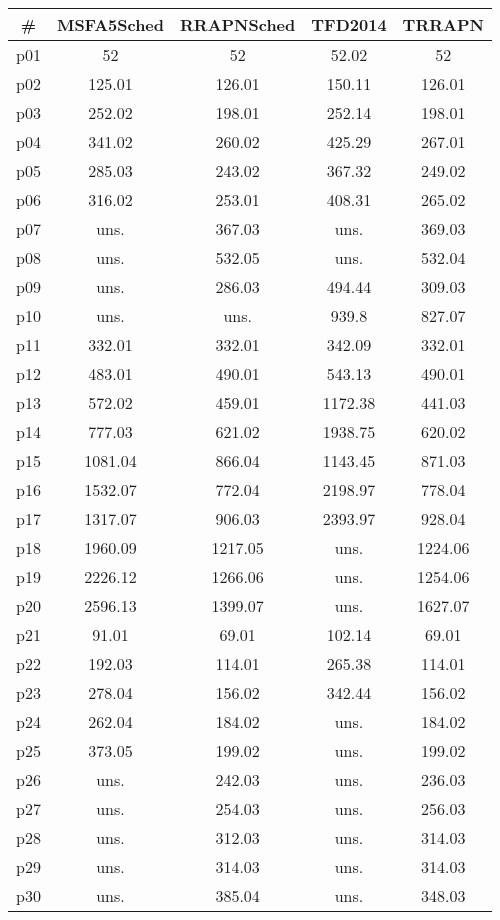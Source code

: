 \begin{tabular}{c||c|c|c|c}
\textbf{\#} & \textbf{MSFA5Sched} & \textbf{RRAPNSched} & \textbf{TFD2014} & \textbf{TRRAPN}\\
\hline
\hline
p01 & 52 & 52 & 52.02 & 52\\
p02 & 125.01 & 126.01 & 150.11 & 126.01\\
p03 & 252.02 & 198.01 & 252.14 & 198.01\\
p04 & 341.02 & 260.02 & 425.29 & 267.01\\
p05 & 285.03 & 243.02 & 367.32 & 249.02\\
p06 & 316.02 & 253.01 & 408.31 & 265.02\\
p07 & uns. & 367.03 & uns. & 369.03\\
p08 & uns. & 532.05 & uns. & 532.04\\
p09 & uns. & 286.03 & 494.44 & 309.03\\
p10 & uns. & uns. & 939.8 & 827.07\\
p11 & 332.01 & 332.01 & 342.09 & 332.01\\
p12 & 483.01 & 490.01 & 543.13 & 490.01\\
p13 & 572.02 & 459.01 & 1172.38 & 441.03\\
p14 & 777.03 & 621.02 & 1938.75 & 620.02\\
p15 & 1081.04 & 866.04 & 1143.45 & 871.03\\
p16 & 1532.07 & 772.04 & 2198.97 & 778.04\\
p17 & 1317.07 & 906.03 & 2393.97 & 928.04\\
p18 & 1960.09 & 1217.05 & uns. & 1224.06\\
p19 & 2226.12 & 1266.06 & uns. & 1254.06\\
p20 & 2596.13 & 1399.07 & uns. & 1627.07\\
p21 & 91.01 & 69.01 & 102.14 & 69.01\\
p22 & 192.03 & 114.01 & 265.38 & 114.01\\
p23 & 278.04 & 156.02 & 342.44 & 156.02\\
p24 & 262.04 & 184.02 & uns. & 184.02\\
p25 & 373.05 & 199.02 & uns. & 199.02\\
p26 & uns. & 242.03 & uns. & 236.03\\
p27 & uns. & 254.03 & uns. & 256.03\\
p28 & uns. & 312.03 & uns. & 314.03\\
p29 & uns. & 314.03 & uns. & 314.03\\
p30 & uns. & 385.04 & uns. & 348.03\\
\end{tabular}

